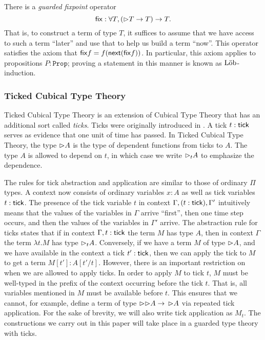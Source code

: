 
There is a \emph{guarded fixpoint} operator
\[ \mathsf{fix} : \forall T, ({\vartriangleright} T \to T) \to T. \]
That is, to construct a term of type $T$, it suffices to assume that we have
access to such a term ``later'' and use that to help us build a term ``now''.
This operator satisfies the axiom that $\mathsf{fix} f = f (\mathsf{next} (\mathsf{fix} f))$. In
particular, this axiom applies to propositions $P : \texttt{Prop}$; proving a
statement in this manner is known as $\text{L\"{o}b}$-induction.

\subsubsection{Ticked Cubical Type Theory}

Ticked Cubical Type Theory \cite{mogelberg-veltri2019} is an extension of
Cubical Type Theory \cite{CohenCoquandHuberMortberg2017} that has an additional
sort called \emph{ticks}. Ticks were originally introduced in
\cite{bahr-grathwohl-bugge-mogelberg2017}. A tick $t : \mathsf{tick}$ serves as evidence
that one unit of time has passed. In Ticked Cubical Type Theory, the type
${\vartriangleright} A$ is the type of dependent functions from ticks to $A$. The type $A$ is
allowed to depend on $t$, in which case we write ${\vartriangleright}_t A$ to emphasize the
dependence.



The rules for tick abstraction and application are similar to those of ordinary
$\Pi$ types. A context now consists of ordinary variables $x : A$ as well as
tick variables $t : \mathsf{tick}$. The presence of the tick variable $t$ in context
$\Gamma, (t : \mathsf{tick}), \Gamma'$ intuitively means that the values of the
variables in $\Gamma$ arrive ``first'', then one time step occurs, and then the
values of the variables in $\Gamma'$ arrive.
%
The abstraction rule for ticks states that if in context $\Gamma, t : \mathsf{tick}$
the term $M$ has type $A$, then in context $\Gamma$ the term $\lambda t.M$ has
type ${\vartriangleright}_t A$.
%
Conversely, if we have a term $M$ of type ${\vartriangleright} A$, and we have available in
the context a tick $t' : \mathsf{tick}$, then we can apply the tick to $M$ to get a
term $M[t'] : A[t'/t]$. However, there is an important restriction on when we
are allowed to apply ticks. In order to apply $M$ to tick $t$, $M$ must be
well-typed in the prefix of the context occurring before the tick $t$. That is,
all variables mentioned in $M$ must be available before $t$. This ensures that
we cannot, for example, define a term of type ${\vartriangleright} {{\vartriangleright}} A \to\, {{\vartriangleright}}
A$ via repeated tick application.
%
For the sake of brevity, we will also write tick application as $M_t$.
The constructions we carry out in this paper will take place in a guarded type
theory with ticks.
